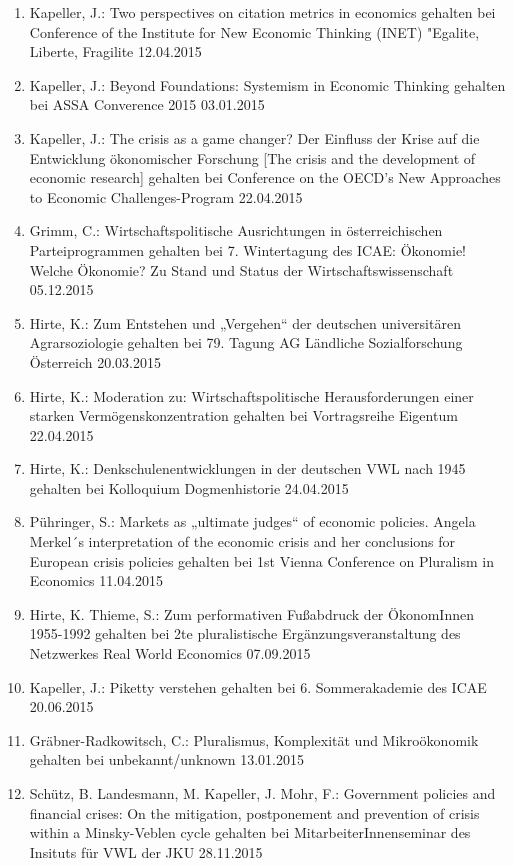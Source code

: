\begin{enumerate}
	\item Kapeller, J.: Two perspectives on citation metrics in economics gehalten bei Conference of the Institute for New Economic Thinking (INET) "Egalite, Liberte, Fragilite 12.04.2015
	\item Kapeller, J.: Beyond Foundations: Systemism in Economic Thinking gehalten bei ASSA Converence 2015 03.01.2015
	\item Kapeller, J.: The crisis as a game changer? Der Einfluss der Krise auf die Entwicklung ökonomischer Forschung [The crisis and the development of economic research] gehalten bei Conference on the OECD's \glqq New Approaches to Economic Challenges\grqq{}-Program 22.04.2015
	\item Grimm, C.: Wirtschaftspolitische Ausrichtungen in österreichischen Parteiprogrammen gehalten bei 7. Wintertagung des ICAE: Ökonomie! Welche Ökonomie? Zu Stand und Status der Wirtschaftswissenschaft 05.12.2015
	\item Hirte, K.: Zum Entstehen und „Vergehen“ der deutschen universitären Agrarsoziologie gehalten bei 79. Tagung AG Ländliche Sozialforschung Österreich 20.03.2015
	\item Hirte, K.: Moderation zu: Wirtschaftspolitische Herausforderungen einer starken Vermögenskonzentration gehalten bei Vortragsreihe \glqq Eigentum\grqq{} 22.04.2015
	\item Hirte, K.: Denkschulenentwicklungen in der deutschen VWL nach 1945 gehalten bei Kolloquium Dogmenhistorie 24.04.2015
	\item Pühringer, S.: Markets as „ultimate judges“ of economic policies. Angela Merkel´s interpretation of the economic crisis and her conclusions for European crisis policies gehalten bei 1st Vienna Conference on Pluralism in Economics 11.04.2015
	\item Hirte, K. Thieme, S.: Zum performativen Fußabdruck der ÖkonomInnen 1955-1992 gehalten bei 2te pluralistische Ergänzungsveranstaltung des Netzwerkes Real World Economics 07.09.2015
	\item Kapeller, J.: Piketty verstehen gehalten bei 6. Sommerakademie des ICAE 20.06.2015
	\item Gräbner-Radkowitsch, C.: Pluralismus, Komplexität und Mikroökonomik gehalten bei unbekannt/unknown 13.01.2015
	\item Schütz, B.  Landesmann, M. Kapeller, J. Mohr, F.: Government policies and financial crises: On the mitigation, postponement and prevention of crisis within a Minsky-Veblen cycle gehalten bei MitarbeiterInnenseminar des Insituts für VWL der JKU 28.11.2015

\end{enumerate}
